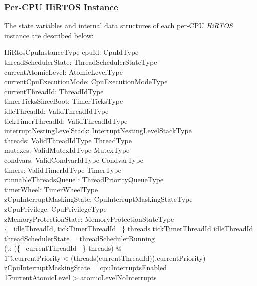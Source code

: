 \documentclass[11pt,letterpaper,twoside,openany]{book}
\begin{document}
\subsubsection{Per-CPU HiRTOS Instance}

The state variables and internal data structures of each per-CPU \emph{HiRTOS} instance
are described below:

\begin{schema}{HiRtosCpuInstanceType}
    cpuId: CpuIdType \\
    threadSchedulerState: ThreadSchedulerStateType \\
    currentAtomicLevel: AtomicLevelType \\
    currentCpuExecutionMode: CpuExecutionModeType \\
    currentThreadId: ThreadIdType \\
    timerTicksSinceBoot: TimerTicksType \\
    idleThreadId: ValidThreadIdType \\
    tickTimerThreadId: ValidThreadIdType \\
    interruptNestingLevelStack: InterruptNestingLevelStackType \\
    threads: ValidThreadIdType \finj ThreadType \\
    mutexes: ValidMutexIdType \finj MutexType \\
    condvars: ValidCondvarIdType \finj CondvarType \\
    timers: ValidTimerIdType \finj TimerType \\
    runnableThreadsQueue : ThreadPriorityQueueType \\
    timerWheel: TimerWheelType \\
    zCpuInterruptMaskingState: CpuInterruptMaskingStateType \\
    zCpuPrivilege: CpuPrivilegeType \\
    zMemoryProtectionState: MemoryProtectionStateType \\
\where
    \{~ idleThreadId, tickTimerThreadId ~\} \subseteq \dom threads
\also
    tickTimerThreadId \neq idleThreadId
\also
    threadSchedulerState = threadSchedulerRunning \implies \\
    (\forall t: \ran (\{~ currentThreadId ~\} \ndres threads) @ \\
\t1    t.currentPriority < (threads(currentThreadId)).currentPriority)
\also
    zCpuInterruptMaskingState = cpuInterruptsEnabled \iff \\
\t1 currentAtomicLevel > atomicLevelNoInterrupts

\end{schema}
\end{document}
